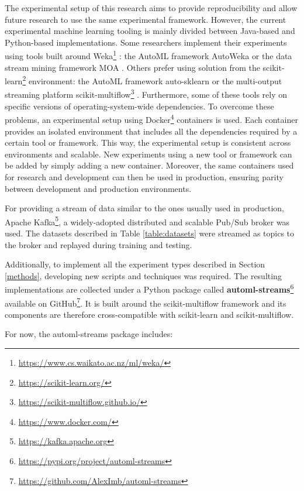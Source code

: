 \documentclass{sig-alternate-br}
\begin{document}
The experimental setup of this research aims to provide reproducibility and allow future research to use the same experimental framework. However, the current experimental machine learning tooling is mainly divided between Java-based and Python-based implementations. Some researchers implement their experiments using tools built around Weka\footnote{\url{https://www.cs.waikato.ac.nz/ml/weka/}} \cite{holmes1994weka}: the AutoML framework AutoWeka \cite{thornton2013autoweka} or the data stream mining framework MOA \cite{bifet2010moa}. Others prefer using solution from the scikit-learn\footnote{\url{https://scikit-learn.org/}} environment: the AutoML framework auto-sklearn \cite{feurer2015autosklearn} or the multi-output streaming platform scikit-multiflow\footnote{\url{https://scikit-multiflow.github.io/}} \cite{montiel2018scikit}. Furthermore, some of these tools rely on specific versions of operating-system-wide dependencies. To overcome these problems, an experimental setup using Docker\footnote{\url{https://www.docker.com/}} containers is used. Each container provides an isolated environment that includes all the dependencies required by a certain tool or framework. This way, the experimental setup is consistent across environments and scalable. New experiments using a new tool or framework can be added by simply adding a new container. Moreover, the same containers used for research and development can then be used in production, ensuring parity between development and production environments.

For providing a stream of data similar to the ones usually used in production, Apache Kafka\footnote{\url{https://kafka.apache.org}}, a widely-adopted distributed and scalable \cite{kreps2011kafka} Pub/Sub broker was used. The datasets described in Table \ref{table:datasets} were streamed as topics to the broker and replayed during training and testing. 

Additionally, to implement all the experiment types described in Section \ref{methods}, developing new scripts and techniques was required. The resulting implementations are collected under a Python package called \textbf{automl-streams}\footnote{\url{https://pypi.org/project/automl-streams}} available on GitHub\footnote{\url{https://github.com/AlexImb/automl-streams}}. It is built around the scikit-multiflow framework and its components are therefore cross-compatible with scikit-learn and scikit-multiflow.

\vspace{1cm}
For now, the automl-streams package includes:
\end{document}
